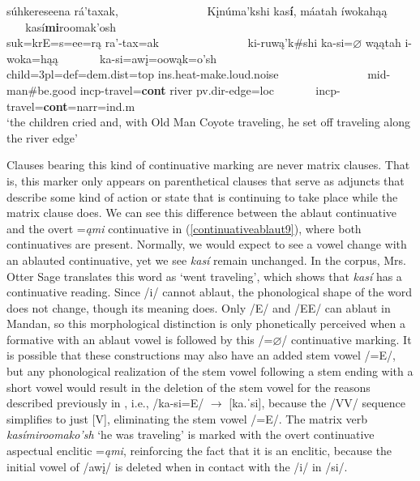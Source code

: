 \begin{exe}
\begin{xlist}
	\glll súhkereseena rá'taxak, ~ ~ ~ ~ ~ ~ ~ ~ ~ Kįnúma'kshi kas\textbf{í}, máatah íwokahąą ~ ~ ~ ~  kasí\textbf{mi}roomak'osh\\
	suk=krE=s=ee=rą ra'-tax=ak ~ ~ ~ ~ ~ ~ ~ ~ ~ ki-ruwą'k\#shi ka-si=$\varnothing$ wąątah i-woka=hąą ~ ~ ~ ~  ka-si=awį=oowąk=o'sh\\
	\textnormal{child}=3pl=def=dem.dist=top ins.heat-\textnormal{make.loud.noise} ~ ~ ~ ~ ~ ~ ~ ~ ~ mid-\textnormal{man}\#\textnormal{be.good} incp-\textnormal{travel}=\textbf{cont} \textnormal{river} pv.dir-\textnormal{edge}=loc ~ ~ ~ ~  incp-\textnormal{travel}=\textbf{cont}=narr=ind.m\\
	\glt `the children cried and, with Old Man Coyote traveling, he set off traveling along the river edge' \citep[31]{hollow1973a}
	
	\end{xlist}

\end{exe}

Clauses bearing this kind of continuative marking are never matrix clauses. That is, this marker only appears on parenthetical clauses that serve as adjuncts that describe some kind of action or state that is continuing to take place while the matrix clause does. We can see this difference between the ablaut continuative and the overt =\textit{ąmi} continuative in (\ref{continuativeablaut9}), where both continuatives are present. Normally, we would expect to see a vowel change with an ablauted continuative, yet we see \textit{kasí} remain unchanged. In the corpus, Mrs. Otter Sage translates this word as `went traveling', which shows that \textit{kasí} has a continuative reading. Since /i/ cannot ablaut, the phonological shape of the word does not change, though its meaning does. Only /E/ and /EE/ can ablaut in Mandan, so this morphological distinction is only phonetically perceived when a formative with an ablaut vowel is followed by this /=$\varnothing$/ continuative marking. It is possible that these constructions may also have an added stem vowel /=E/, but any phonological realization of the stem vowel following a stem ending with a short vowel would result in the deletion of the stem vowel for the reasons described previously in , i.e., /ka-si=E/ $\to$ [ka.ˈsi], because the /VV/ sequence simplifies to just [V], eliminating the stem vowel /=E/. The matrix verb \textit{kasímiroomako'sh} `he was traveling' is marked with the overt continuative aspectual enclitic =\textit{ąmi}, reinforcing the fact that it is an enclitic, because the initial vowel of /awį/ is deleted when in contact with the /i/ in /si/.

